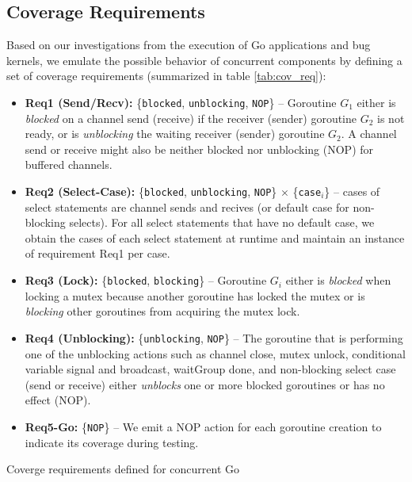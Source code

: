 \subsection{Coverage Requirements}
\label{sec:covreq}
Based on our investigations from the execution of Go applications and bug kernels, we emulate the possible behavior of concurrent components by defining a set of coverage requirements (summarized in table \ref{tab:cov_req}):
%
\begin{itemize}
  \item \textbf{Req1 (Send/Recv):} \{\texttt{blocked}, \texttt{unblocking}, \texttt{NOP}\} -- Goroutine $G_1$ either is \textit{blocked} on a channel send (receive) if the receiver (sender) goroutine $G_2$ is not ready, or is \textit{unblocking} the waiting receiver (sender) goroutine $G_2$. A channel send or receive might also be neither blocked nor unblocking (NOP) for buffered channels.
  \item \textbf{Req2 (Select-Case):} \{\texttt{blocked}, \texttt{unblocking}, \texttt{NOP}\} $\times$ \{\texttt{case}$_i$\} -- cases of select statements are channel sends and recives (or default case for non-blocking selects). For all select statements that have no default case, we obtain the cases of each select statement at runtime and maintain an instance of requirement Req1 per case.
  \item \textbf{Req3 (Lock):} \{\texttt{blocked}, \texttt{blocking}\} -- Goroutine $G_i$ either is \textit{blocked} when locking a mutex because another goroutine has locked the mutex or is \textit{blocking} other goroutines from acquiring the mutex lock.
  \item \textbf{Req4 (Unblocking):} \{\texttt{unblocking}, \texttt{NOP}\} -- The goroutine that is performing one of the unblocking actions such as channel close, mutex unlock, conditional variable signal and broadcast, waitGroup done, and non-blocking select case (send or receive) either \textit{unblocks} one or more blocked goroutines or has no effect (NOP).
  \item \textbf{Req5-Go:} \{\texttt{NOP}\} -- We emit a NOP action for each goroutine creation to indicate its coverage during testing.
\end{itemize}


\begin{table}[]
\centering
\caption{Coverge requirements defined for concurrent Go}
\scalebox{0.75}{

}
\label{tab:cov_req}
\end{table}


